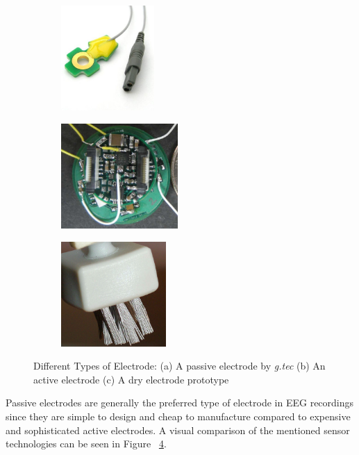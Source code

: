 \documentclass[12pt]{article}
\numberwithin{equation}{section}
\numberwithin{figure}{section}
\numberwithin{table}{section}
\begin{document}
\par {
    \begin{figure}
        \centering
        \begin{subfigure}{.33\textwidth}
            \centering
            \includegraphics[height=4cm]{images/gtec_passive}
            \caption{}
            \label{fig:electrode_gtec}
        \end{subfigure}%
        \begin{subfigure}{.33\textwidth}
            \centering
            \includegraphics[height=4cm]{images/active_electrode}
            \caption{}
            \label{fig:electrode_active}
        \end{subfigure}%
        \begin{subfigure}{.33\textwidth}
            \centering
            \includegraphics[height=4cm]{images/bristle_dry}
            \caption{}
            \label{fig:electrode_dry}
        \end{subfigure}
        \caption[Different Types of Electrode]{Different Types of Electrode: (a) A passive electrode by \emph{g.tec} (b) An active electrode \citep{sullivan_low-noise_2007} (c) A dry electrode prototype \citep{grozea_bristle-sensorslow-cost_2011}}
        \label{fig:diff_types_electrode}
    \end{figure}

    Passive electrodes are generally the preferred type of electrode in EEG recordings
    since they are simple to design and cheap to manufacture \citep{wolpaw_brain-computer_2012}
    compared to expensive and sophisticated active electrodes. A visual comparison
    of the mentioned sensor technologies can be seen in Figure ~\ref{fig:diff_types_electrode}.
}
\end{document}
